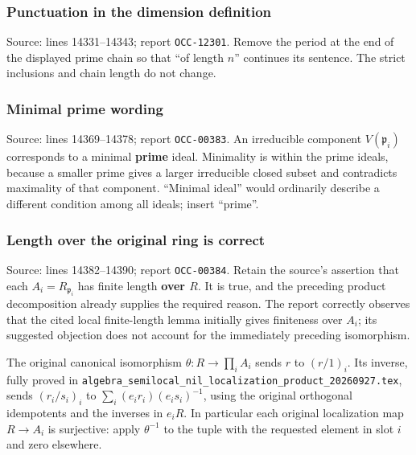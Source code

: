 \subsubsection{Punctuation in the dimension definition}\label{algebra-proof-003-punctuation-in-the-dimension-definition}

Source: lines 14331--14343; report \texttt{OCC-12301}. Remove the period at the end of the displayed prime chain so that ``of length \(n\)'' continues its sentence. The strict inclusions and chain length do not change.

\subsubsection{Minimal prime wording}\label{algebra-proof-003-minimal-prime-wording}

Source: lines 14369--14378; report \texttt{OCC-00383}. An irreducible component \(V(\mathfrak p_i)\) corresponds to a minimal \textbf{prime} ideal. Minimality is within the prime ideals, because a smaller prime gives a larger irreducible closed subset and contradicts maximality of that component. ``Minimal ideal'' would ordinarily describe a different condition among all ideals; insert ``prime''.

\subsubsection{Length over the original ring is correct}\label{algebra-proof-003-length-over-the-original-ring-is-correct}

Source: lines 14382--14390; report \texttt{OCC-00384}. Retain the source's assertion that each \(A_i=R_{\mathfrak p_i}\) has finite length \textbf{over \(R\)}. It is true, and the preceding product decomposition already supplies the required reason. The report correctly observes that the cited local finite-length lemma initially gives finiteness over \(A_i\); its suggested objection does not account for the immediately preceding isomorphism.

The original canonical isomorphism \(\theta:R\to\prod_i A_i\) sends \(r\) to \((r/1)_i\). Its inverse, fully proved in \texttt{algebra\_semilocal\_nil\_localization\_product\_20260927.tex}, sends \((r_i/s_i)_i\) to \(\sum_i(e_i r_i)(e_i s_i)^{-1}\), using the original orthogonal idempotents and the inverses in \(e_iR\). In particular each original localization map \(R\to A_i\) is surjective: apply \(\theta^{-1}\) to the tuple with the requested element in slot \(i\) and zero elsewhere.

